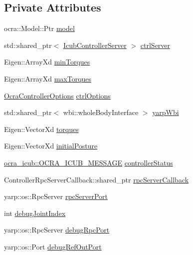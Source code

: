 \subsection*{Private Attributes}
\begin{DoxyCompactItemize}
\item 
ocra\+::\+Model\+::\+Ptr \hyperlink{classThread_a1dcef9aedc1a707e6f04d5fb6e4a0b13}{model}
\item 
std\+::shared\+\_\+ptr$<$ \hyperlink{classIcubControllerServer}{Icub\+Controller\+Server} $>$ \hyperlink{classThread_ace1179249de64e545f43dc48529fbbb6}{ctrl\+Server}
\item 
Eigen\+::\+Array\+Xd \hyperlink{classThread_a414015415c64371877d6028417c4f9e2}{min\+Torques}
\item 
Eigen\+::\+Array\+Xd \hyperlink{classThread_af28a4fcbbcbf77c42237c0be75a25a54}{max\+Torques}
\item 
\hyperlink{classOcraControllerOptions}{Ocra\+Controller\+Options} \hyperlink{classThread_af96a166364f0c6a680115600b3bd232e}{ctrl\+Options}
\item 
std\+::shared\+\_\+ptr$<$ wbi\+::whole\+Body\+Interface $>$ \hyperlink{classThread_aa3f4bbc2dca15c247a13de1bdbc4f7a3}{yarp\+Wbi}
\item 
Eigen\+::\+Vector\+Xd \hyperlink{classThread_a3238993799b36af06f3858a3f65dcf1e}{torques}
\item 
Eigen\+::\+Vector\+Xd \hyperlink{classThread_aa59863bb50c8aa88fe5872e75be44cb7}{initial\+Posture}
\item 
\hyperlink{namespaceocra__icub_afbd2db66b68005fb7cfac19210caf83f}{ocra\+\_\+icub\+::\+O\+C\+R\+A\+\_\+\+I\+C\+U\+B\+\_\+\+M\+E\+S\+S\+A\+GE} \hyperlink{classThread_a913cf23e86cdaefd036b782f7417254d}{controller\+Status}
\item 
Controller\+Rpc\+Server\+Callback\+::shared\+\_\+ptr \hyperlink{classThread_a602de8d12886c9c57b5420c83804a38b}{rpc\+Server\+Callback}
\item 
yarp\+::os\+::\+Rpc\+Server \hyperlink{classThread_adbec1b4f2c8fc40641df6f118e93fd25}{rpc\+Server\+Port}
\item 
int \hyperlink{classThread_aedf960b8e991868561f35193702245b0}{debug\+Joint\+Index}
\item 
yarp\+::os\+::\+Rpc\+Server \hyperlink{classThread_aa6b8f3712e7776d560b0a535eff73c34}{debug\+Rpc\+Port}
\item 
yarp\+::os\+::\+Port \hyperlink{classThread_a3780b51f82c50fd2738afbd0ae9b9526}{debug\+Ref\+Out\+Port}
\item 

\end{DoxyCompactItemize}
